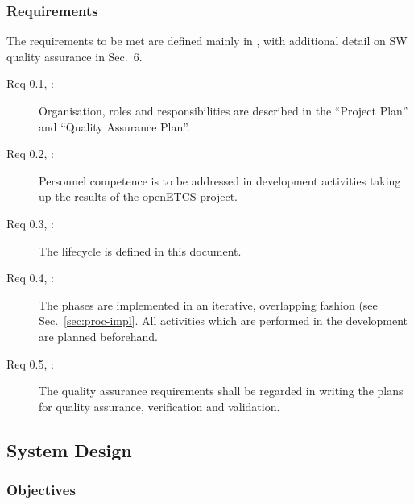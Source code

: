 \documentclass{template/openetcs_article}
\begin{document}
\subsubsection{Requirements}
\label{sec:0-requirements}

The requirements to be met are defined mainly in \cite[Sec.~5,
7.1]{EN50128:2011}, with additional detail on SW quality assurance in
Sec.~6.

 \begin{description}
\item[Req 0.1, {\cite[Sec.~5.1]{EN50128:2011}}:] Organisation, roles and
  responsibilities are described in the ``Project Plan'' and ``Quality
  Assurance Plan''.
\item[Req 0.2, {\cite[Sec.~5.2]{EN50128:2011}}:] Personnel competence is
  to be addressed in development activities taking up the results of
  the openETCS project. 
\item[Req 0.3, {\cite[Sec.~5.3]{EN50128:2011}}:] The lifecycle is defined
  in this document.
\item[Req 0.4, {\cite[Sec.~7.1, 5.3.2.5]{EN50128:2011}}:] The phases are
  implemented in an iterative, overlapping fashion (see
  Sec.~\ref{sec:proc-impl}. All activities which are performed in the
  development are planned beforehand.
\item[Req 0.5, {\cite[Sec.~6]{EN50128:2011}}:] The quality assurance
  requirements shall be regarded in writing the plans for quality
  assurance, verification and validation.
 \end{description}

\subsection{System Design}
\label{sec:systemPhase}

\subsubsection{Objectives}
\label{sec:1-objectives}
\end{document}
